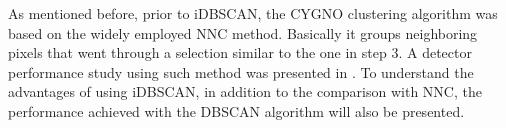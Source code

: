 \documentclass[a4paper,11pt]{article}
\begin{document}





As mentioned before, prior to iDBSCAN, the CYGNO clustering algorithm was based on the widely employed NNC method. Basically it groups neighboring pixels that went through a selection similar to the one in step 3. A detector performance study using such method was presented in \cite{bib:fe55}.
To understand the advantages of using iDBSCAN, in addition to the comparison with NNC, the performance achieved with the DBSCAN algorithm will also be presented.
\end{document}
